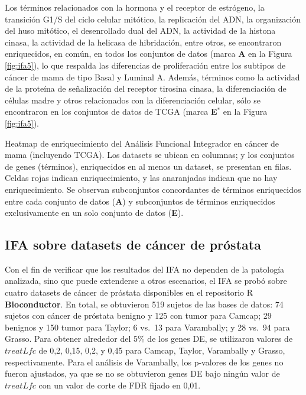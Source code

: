 \documentclass[12pt,twoside]{reedthesis}
\begin{document}
Los términos relacionados con la hormona y el receptor de estrógeno, la transición G1/S del ciclo celular mitótico, la replicación del ADN, la organización del huso mitótico, el desenrollado dual del ADN, la actividad de la histona cinasa, la actividad de la helicasa de hibridación, entre otros, se encontraron enriquecidos, en común, en todos los conjuntos de datos (marca \textbf{A} en la Figura \ref{fig:ifa5}), lo que respalda las diferencias de proliferación entre los subtipos de cáncer de mama de tipo Basal y Luminal A. Además, términos como la actividad de la proteína de señalización del receptor tirosina cinasa, la diferenciación de células madre y otros relacionados con la diferenciación celular, sólo se encontraron en los conjuntos de datos de TCGA (marca \textbf{E\(^*\)} en la Figura \ref{fig:ifa5}).

Heatmap de enriquecimiento del Análisis Funcional Integrador en cáncer de mama (incluyendo TCGA). Los datasets se ubican en columnas; y los conjuntos de genes (términos), enriquecidos en al menos un dataset, se presentan en filas. Celdas rojas indican enriquecimiento, y las anaranjadas indican que no hay enriquecimiento. Se observan subconjuntos concordantes de términos enriquecidos entre cada conjunto de datos (\textbf{A}) y subconjuntos de términos enriquecidos exclusivamente en un solo conjunto de datos (\textbf{E}).



\hypertarget{ifa-sobre-datasets-de-cuxe1ncer-de-pruxf3stata}{%
\subsection{IFA sobre datasets de cáncer de próstata}\label{ifa-sobre-datasets-de-cuxe1ncer-de-pruxf3stata}}

\par

Con el fin de verificar que los resultados del IFA no dependen de la patología analizada, sino que puede extenderse a otros escenarios, el IFA se probó sobre cuatro datasets de cáncer de próstata disponibles en el repositorio R \textbf{Bioconductor}. En total, se obtuvieron 519 sujetos de las bases de datos: 74 sujetos con cáncer de próstata benigno y 125 con tumor para Camcap; 29 benignos y 150 tumor para Taylor; 6 vs.~13 para Varambally; y 28 vs.~94 para Grasso. Para obtener alrededor del 5\% de los genes DE, se utilizaron valores de \(treatLfc\) de 0,2, 0,15, 0,2, y 0,45 para Camcap, Taylor, Varambally y Grasso, respectivamente. Para el análisis de Varambally, los p-valores de los genes no fueron ajustados, ya que se no se obtuvieron genes DE bajo ningún valor de \(treatLfc\) con un valor de corte de FDR fijado en 0,01.
\end{document}
